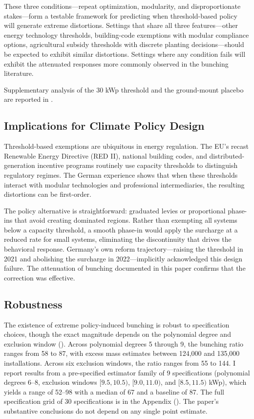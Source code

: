 \documentclass[12pt]{article}
\begin{document}
These three conditions---repeat optimization, modularity, and disproportionate stakes---form a testable framework for predicting when threshold-based policy will generate extreme distortions. Settings that share all three features---other energy technology thresholds, building-code exemptions with modular compliance options, agricultural subsidy thresholds with discrete planting decisions---should be expected to exhibit similar distortions. Settings where any condition fails will exhibit the attenuated responses more commonly observed in the bunching literature.

Supplementary analysis of the 30 kWp threshold and the ground-mount placebo are reported in .

\subsection{Implications for Climate Policy Design}

Threshold-based exemptions are ubiquitous in energy regulation. The EU's recast Renewable Energy Directive (RED II), national building codes, and distributed-generation incentive programs routinely use capacity thresholds to distinguish regulatory regimes. The German experience shows that when these thresholds interact with modular technologies and professional intermediaries, the resulting distortions can be first-order.

The policy alternative is straightforward: graduated levies or proportional phase-ins that avoid creating dominated regions. Rather than exempting all systems below a capacity threshold, a smooth phase-in would apply the surcharge at a reduced rate for small systems, eliminating the discontinuity that drives the behavioral response. Germany's own reform trajectory---raising the threshold in 2021 and abolishing the surcharge in 2022---implicitly acknowledged this design failure. The attenuation of bunching documented in this paper confirms that the correction was effective.

\subsection{Robustness}

The existence of extreme policy-induced bunching is robust to specification choices, though the exact magnitude depends on the polynomial degree and exclusion window (). Across polynomial degrees 5 through 9, the bunching ratio ranges from 58 to 87, with excess mass estimates between 124,000 and 135,000 installations. Across six exclusion windows, the ratio ranges from 55 to 144. I report results from a pre-specified estimator family of 9 specifications (polynomial degrees 6--8, exclusion windows $[9.5, 10.5)$, $[9.0, 11.0)$, and $[8.5, 11.5)$ kWp), which yields a range of 52--98 with a median of 67 and a baseline of 87. The full specification grid of 30 specifications is in the Appendix (). The paper's substantive conclusions do not depend on any single point estimate.
\end{document}
